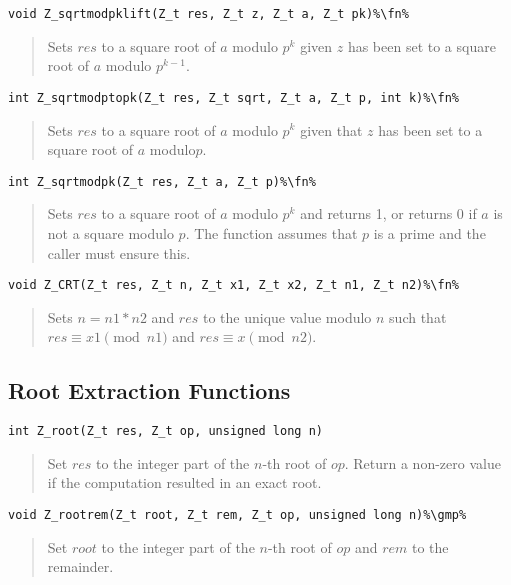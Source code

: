 \documentclass[a4paper,10pt]{article}
\newcommand{\fn}{\hfill[Function]}
\newcommand{\gmp}{\hfill[GMP]}
\begin{document}
\begin{lstlisting}
void Z_sqrtmodpklift(Z_t res, Z_t z, Z_t a, Z_t pk)%\fn%
\end{lstlisting}
\begin{quote}Sets $res$ to a square root of $a$ modulo $p^k$ given $z$ has been set to a square root of $a$ modulo $p^{k-1}$.\end{quote}

\begin{lstlisting}
int Z_sqrtmodptopk(Z_t res, Z_t sqrt, Z_t a, Z_t p, int k)%\fn%
\end{lstlisting}
\begin{quote}Sets $res$ to a square root of $a$ modulo $p^k$ given that $z$ has been set to a square root of $a$ modulo$p$.\end{quote}

\begin{lstlisting}
int Z_sqrtmodpk(Z_t res, Z_t a, Z_t p)%\fn%
\end{lstlisting}
\begin{quote}Sets $res$ to a square root of $a$ modulo $p^k$ and returns 1, or returns 0 if $a$ is not a square modulo $p$. The function assumes that $p$ is a prime and the caller must ensure this.\end{quote}

\begin{lstlisting}
void Z_CRT(Z_t res, Z_t n, Z_t x1, Z_t x2, Z_t n1, Z_t n2)%\fn%
\end{lstlisting}
\begin{quote}Sets $n = n1*n2$ and $res$ to the unique value modulo $n$ such that $res \equiv x1 \pmod{n1}$ and $res \equiv x \pmod{n2}$.\end{quote}

\subsection{Root Extraction Functions}
\begin{lstlisting}
int Z_root(Z_t res, Z_t op, unsigned long n)
\end{lstlisting}
\begin{quote}Set $res$ to the integer part of the $n$-th root of $op$. Return a non-zero value if the computation resulted in an exact root.\end{quote}

\begin{lstlisting}
void Z_rootrem(Z_t root, Z_t rem, Z_t op, unsigned long n)%\gmp%
\end{lstlisting}
\begin{quote}Set $root$ to the integer part of the $n$-th root of $op$ and $rem$ to the remainder.\end{quote}
\end{document}
